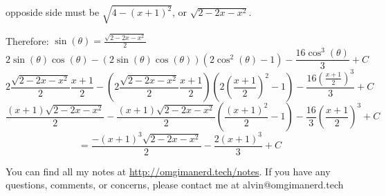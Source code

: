 \documentclass[letterpaper, 12pt]{math}
\begin{document}
opposide side must be \( \sqrt{4-(x+1)^{2}} \), or \( \sqrt{2-2x-x^{2}} \).
\begin{center}
\end{center}
Therefore: \( \sin(\theta) = \frac{\sqrt{2-2x-x^{2}}}{2} \)
\[ 2\sin(\theta)\cos(\theta)-
   (2\sin(\theta)\cos(\theta))(2\cos^{2}(\theta)-1)-
   \frac{16\cos^{3}(\theta)}{3}+C \]
\[ 2\frac{\sqrt{2-2x-x^{2}}}{2}\frac{x+1}{2}-
   (2\frac{\sqrt{2-2x-x^{2}}}{2}\frac{x+1}{2})(2(\frac{x+1}{2})^{2}-1)-
   \frac{16(\frac{x+1}{2})^{3}}{3}+C \]
\[ \frac{(x+1)\sqrt{2-2x-x^{2}}}{2}-
   \frac{(x+1)\sqrt{2-2x-x^{2}}}{2}(\frac{(x+1)^{2}}{2}-1)-
   \frac{16}{3}(\frac{x+1}{2})^{3}+C \]
\[ = \frac{-(x+1)^{3}\sqrt{2-2x-x^{2}}}{2}-\frac{2(x+1)^{3}}{3}+C \]

\begin{center}
  You can find all my notes at \url{http://omgimanerd.tech/notes}. If you have
  any questions, comments, or concerns, please contact me at
  alvin@omgimanerd.tech
\end{center}
\end{document}
